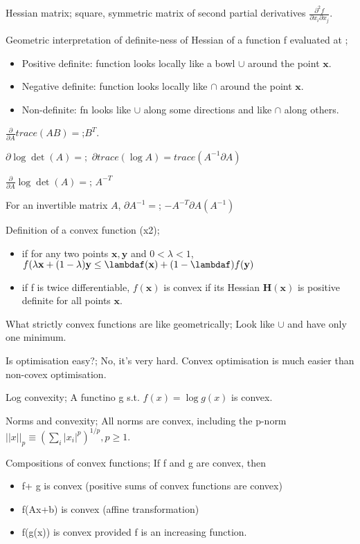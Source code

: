 \documentclass{article}
\begin{document}
Hessian matrix; square, symmetric matrix of second partial derivatives $\frac{\partial^2 f}{\partial x_i \partial x_j}$.

Geometric interpretation of definite-ness of Hessian of a function f evaluated at ; \begin{itemize}
    \item Positive definite: function looks locally like a bowl $\cup$ around the point $\mathbf{x}$.
    \item Negative definite: function looks locally like $\cap$ around the point $\mathbf{x}$.
    \item Non-definite: fn looks like $\cup$ along some directions and like $\cap$ along others.
\end{itemize} 

$\frac{\partial}{\partial A}trace(AB) =$;$B^T$.

$\partial \log \det (A) =;$ $\partial trace(\log A) = trace(A^{-1}\partial A)$

$\frac{\partial}{\partial A}\log\det(A)=$; $A^{-T}$

For an invertible matrix $A$, $\partial A^{-1}=$; $-A^{-T}\partial A (A^{-1})$

Definition of a convex function (x2); \begin{itemize}
    \item if for any two points $\mathbf{x, y}$ and $0<\lambda < 1$, $f(\lambda\mathbf{x}+(1-\lambda)\mathbf{y}\leq \lambdaf(\mathbf{x})+(1-\lambdaf)f(\mathbf{y})$
    \item if f is twice  differentiable, $f(\mathbf{x})$ is convex if its Hessian $\mathbf{H(x)}$ is positive definite for all points $\mathbf{x}$.
\end{itemize}

What strictly convex functions are like geometrically; Look like $\cup$ and have only one minimum.

Is optimisation easy?; No, it's very hard. Convex optimisation is much easier than non-covex optimisation.

Log convexity; A functino g s.t. $f(x)=\log g(x)$ is convex.

Norms and convexity; All norms are convex, including the p-norm $||x||_p \equiv (\sum_i |x_i|^p)^{1/p}, p\geq 1$.

Compositions of convex functions; If f and g are convex, then \begin{itemize}
    \item f+ g is convex (positive sums of convex functions are convex)
    \item f(Ax+b) is convex (affine transformation)
    \item f(g(x)) is convex provided f is an increasing function.
\end{itemize}
\end{document}
